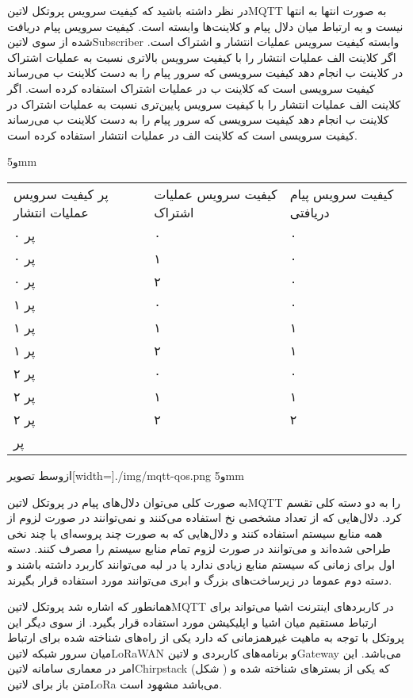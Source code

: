 در نظر داشته باشید که کیفیت سرویس پروتکل ‌لاتین{MQTT} به صورت انتها به انتها نیست و به ارتباط میان دلال پیام و کلاینت‌ها وابسته است.
کیفیت سرویس پیام دریافت شده از سوی ‌لاتین{Subscriber} وابسته کیفیت سرویس عملیات انتشار و اشتراک است. اگر کلاینت الف عملیات انتشار را با کیفیت سرویس بالاتری
نسبت به عملیات اشتراک در کلاینت ب انجام دهد کیفیت سرویسی که سرور پیام را به دست کلاینت ب می‌رساند کیفیت سرویسی است که کلاینت ب در عملیات اشتراک استفاده کرده است.
اگر کلاینت الف عملیات انتشار را با کیفیت سرویس پایین‌تری نسبت به عملیات اشتراک در کلاینت ب انجام دهد کیفیت سرویسی که سرور پیام را به دست کلاینت ب می‌رساند کیفیت سرویسی است که
کلاینت الف در عملیات انتشار استفاده کرده است.

‌و{5mm}
\begin{tabularx}{\textwidth}{|X|X|X|}
‌پر
کیفیت سرویس عملیات انتشار & کیفیت سرویس عملیات اشتراک & کیفیت سرویس پیام دریافتی \\
‌پر
۰ & ۰ & ۰ \\
‌پر
۰ & ۱ & ۰ \\
‌پر
۰ & ۲ & ۰ \\
‌پر
۱ & ۰ & ۰ \\
‌پر
۱ & ۱ & ۱ \\
‌پر
۱ & ۲ & ۱ \\
‌پر
۲ & ۰ & ۰ \\
‌پر
۲ & ۱ & ۱ \\
‌پر
۲ & ۲ & ۲ \\
‌پر
\end{tabularx}

‌ازوسط
‌تصویر[width=\textwidth]{./img/mqtt-qos.png}
‌و{5mm}

به صورت کلی می‌توان دلال‌های پیام در پروتکل ‌لاتین{MQTT} را به دو دسته کلی تقسم کرد. دلال‌هایی که از تعداد مشخصی نخ استفاده می‌کنند و نمی‌توانند در صورت لزوم از همه منابع سیستم استفاده کنند و دلال‌هایی که به صورت چند پروسه‌ای یا چند نخی طراحی شده‌اند
و می‌توانند در صورت لزوم تمام منابع سیستم را مصرف کنند. دسته اول برای زمانی که سیستم منابع زیادی ندارد یا در لبه می‌توانند کاربرد داشته باشند و دسته دوم عموما در زیرساخت‌های بزرگ و ابری می‌توانند مورد استفاده قرار بگیرند.

همانطور که اشاره شد پروتکل ‌لاتین{MQTT} در کاربردهای اینترنت اشیا می‌تواند برای ارتباط مستقیم میان اشیا و اپلیکیشن مورد استفاده قرار بگیرد. از سوی دیگر این پروتکل با توجه به ماهیت غیرهمزمانی که دارد یکی از راه‌های شناخته شده برای ارتباط میان سرور شبکه ‌لاتین{LoRaWAN}
و برنامه‌های کاربردی و ‌لاتین{Gateway} می‌باشد. این امر در معماری سامانه ‌لاتین{Chirpstack} (شکل ) که یکی از بسترهای شناخته شده و متن باز برای ‌لاتین{LoRa} می‌باشد مشهود است.


